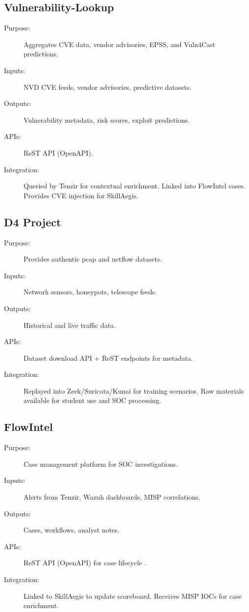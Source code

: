 \documentclass[10pt,a4paper]{report}
\begin{document}
\subsection{Vulnerability-Lookup}
\begin{description}
  \item[Purpose:] Aggregates CVE data, vendor advisories, EPSS, and Vuln4Cast
  predictions.
  \item[Inputs:] NVD CVE feeds, vendor advisories, predictive datasets.
  \item[Outputs:] Vulnerability metadata, risk scores, exploit predictions.
  \item[APIs:] ReST API (OpenAPI)\cite{vopenapi}.
  \item[Integration:] Queried by Tenzir for contextual enrichment. Linked into
  FlowIntel cases. Provides CVE injection for SkillAegis.
\end{description}

\subsection{D4 Project}
\begin{description}
  \item[Purpose:] Provides authentic pcap and netflow datasets.
  \item[Inputs:] Network sensors, honeypots, telescope feeds.
  \item[Outputs:] Historical and live traffic data.
  \item[APIs:] Dataset download API + ReST endpoints for metadata.
  \item[Integration:] Replayed into Zeek/Suricata/Kunai for training
  scenarios. Raw materials available for student use and SOC processing.
\end{description}

\subsection{FlowIntel}
\begin{description}
  \item[Purpose:] Case management platform for SOC investigations.
  \item[Inputs:] Alerts from Tenzir, Wazuh dashboards, MISP correlations.
  \item[Outputs:] Cases, workflows, analyst notes.
  \item[APIs:] ReST API (OpenAPI) for case lifecycle \cite{fopenapi}.
  \item[Integration:] Linked to SkillAegis to update scoreboard. Receives
  MISP IOCs for case enrichment.
\end{description}
\end{document}
